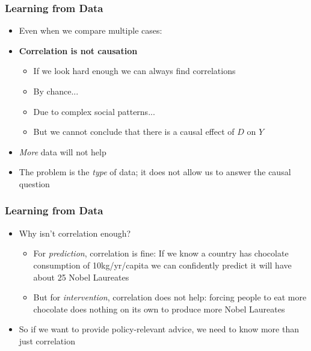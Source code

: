 \documentclass[xcolor=x11names,compress]{beamer}\usepackage[]{graphicx}\usepackage[]{color}
\renewcommand{\(}{\begin{columns}}
\renewcommand{\)}{\end{columns}}
\newcommand{\<}[1]{\begin{column}{#1}}
\renewcommand{\>}{\end{column}}
\begin{document}
\begin{frame}
\frametitle{Learning from Data}
\begin{itemize}
\item Even when we compare multiple cases: 
\pause
\item \textbf{Correlation is not causation}
\pause
\begin{itemize}
\item If we look hard enough we can always find correlations
\pause
\item By chance...
\pause
\item Due to complex social patterns...
\pause
\item But we cannot conclude that there is a causal effect of $D$ on $Y$
\pause
\end{itemize}
\item \textit{More} data will not help
\pause
\item The problem is the \textit{type} of data; it does not allow us to answer the causal question 
\end{itemize}
\end{frame}











\begin{frame}
\frametitle{Learning from Data}
\begin{itemize}
\item Why isn't correlation enough?
\pause
\begin{itemize}
\item For \textit{prediction}, correlation is fine: If we know a country has chocolate consumption of 10kg/yr/capita we can confidently predict it will have about 25 Nobel Laureates
\pause
\item But for \textit{intervention}, correlation does not help: forcing people to eat more chocolate does nothing on its own to produce more Nobel Laureates
\pause
\end{itemize}
\item So if we want to provide policy-relevant advice, we need to know more than just correlation
\end{itemize}
\end{frame}
\end{document}
